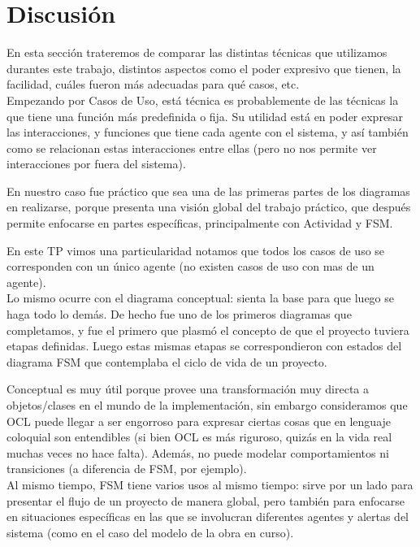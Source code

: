 \section{Discusión}
En esta sección trateremos de comparar las distintas técnicas que utilizamos 
durantes este trabajo, distintos aspectos como el poder expresivo que tienen, la facilidad, 
cuáles fueron más adecuadas para qué casos, etc. \\

Empezando por Casos de Uso, está técnica es probablemente de las técnicas la que 
tiene una función más predefinida o fija. Su utilidad está en poder expresar las interacciones, 
y funciones que tiene cada agente con el sistema, y así también como se relacionan 
estas interacciones entre ellas (pero no nos permite ver interacciones por fuera del sistema).

En nuestro caso fue práctico que sea una de las primeras partes de los diagramas en realizarse, 
porque presenta una visión global del trabajo práctico, que después permite enfocarse en partes específicas, principalmente con Actividad y FSM.

En este TP vimos una particularidad notamos que todos los casos de uso se corresponden con un único agente (no existen casos de uso con mas de un agente).\\

Lo mismo ocurre con el diagrama conceptual: sienta la base para que luego se haga todo lo demás. De hecho fue uno de los primeros diagramas que completamos, y fue el primero que plasmó el concepto de que el proyecto tuviera etapas definidas. Luego estas mismas etapas se correspondieron con estados del diagrama FSM que contemplaba el ciclo de vida de un proyecto.

Conceptual es muy útil porque provee una transformación muy directa a objetos/clases en el mundo de la implementación, sin embargo consideramos que OCL puede llegar a ser engorroso para expresar ciertas cosas que en lenguaje coloquial son entendibles (si bien OCL es más riguroso, quizás en la vida real muchas veces no hace falta). Además, no puede modelar comportamientos ni transiciones (a diferencia de FSM, por ejemplo).\\

Al mismo tiempo, FSM tiene varios usos al mismo tiempo: sirve por un lado para presentar el flujo de un proyecto de manera global, pero también para enfocarse en situaciones específicas en las que se involucran diferentes agentes y alertas del sistema (como en el caso del modelo de la obra en curso).

